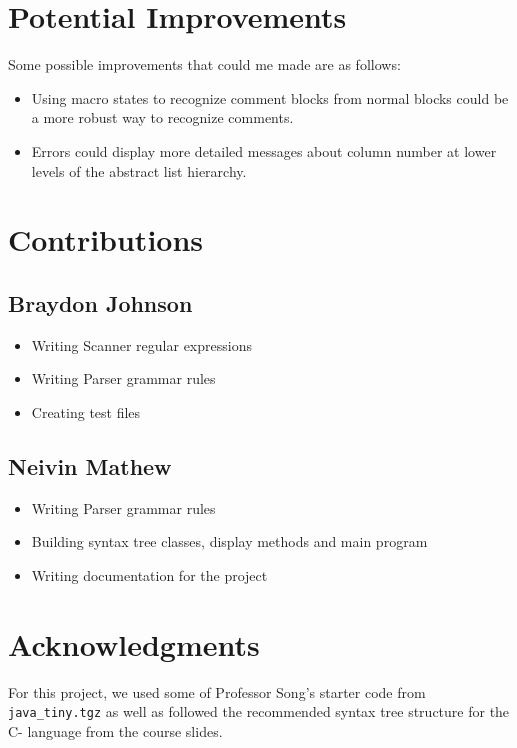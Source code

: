 \documentclass[12pt,letterpaper]{article}
\begin{document}
\section{Potential Improvements}
Some possible improvements that could me made are as follows:
\begin{itemize}[leftmargin=12pt]
\item Using macro states to recognize comment blocks from normal blocks could be a more robust way to recognize comments.
\item Errors could display more detailed messages about column number at lower levels of the abstract list hierarchy.
\end{itemize}

\section{Contributions}
\subsection{Braydon Johnson}
\begin{itemize}[leftmargin=12pt]
\item Writing Scanner regular expressions
\item Writing Parser grammar rules
\item Creating test files
\end{itemize}

\subsection{Neivin Mathew}
\begin{itemize}[leftmargin=12pt]
\item Writing Parser grammar rules
\item Building syntax tree classes, display methods and main program
\item Writing documentation for the project
\end{itemize}

\section{Acknowledgments}
For this project, we used some of Professor Song's starter code from \texttt{java\_tiny.tgz} as well as followed the recommended syntax tree structure for the C- language from the course slides.
\end{document}
